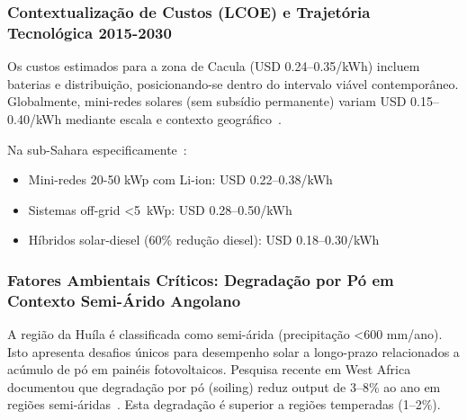 \documentclass[12pt, a4paper]{article}
\begin{document}
\begin{table}[H]
\centering
\caption{Comparação de Tecnologias Solares Comunitárias em Angola}
\label{Tab:6}
\footnotesize
{}
\end{table}

\subsubsection{Contextualização de Custos (LCOE) e Trajetória Tecnológica 2015-2030}

Os custos estimados para a zona de Cacula (USD 0.24--0.35/kWh) incluem baterias e distribuição, posicionando-se dentro do intervalo viável contemporâneo.
Globalmente, mini-redes solares (sem subsídio permanente) variam USD 0.15--0.40/kWh mediante escala e contexto geográfico~\citep{Ramasamy2022}.

Na sub-Sahara especificamente~\citep{IRENA2022}:
\begin{itemize}
\item Mini-redes 20-50 kWp com Li-ion: USD 0.22--0.38/kWh
\item Sistemas off-grid <5~kWp: USD 0.28--0.50/kWh
\item Híbridos solar-diesel (60\% redução diesel): USD 0.18--0.30/kWh
\end{itemize}

\subsubsection{Fatores Ambientais Críticos: Degradação por Pó em Contexto Semi-Árido Angolano}

A região da Huíla é classificada como semi-árida (precipitação <600 mm/ano).
Isto apresenta desafios únicos para desempenho solar a longo-prazo relacionados a acúmulo de pó em painéis fotovoltaicos.
Pesquisa recente em West Africa documentou que degradação por pó (soiling) reduz output de 3--8\% ao ano em regiões semi-áridas~\citep{Isaacs2025}.
Esta degradação é superior a regiões temperadas (1--2\%).
\end{document}
